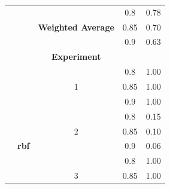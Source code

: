 \documentclass{mpaper}
\begin{document}
\begin{table}[]
\begin{tabular}{|l|c|ccc|}
                                            &                 & \multicolumn{1}{l|}{}                          & \multicolumn{1}{c|}{0.8}                & 0.78               \\
                                            &                 & \multicolumn{1}{c|}{\textbf{Weighted Average}} & \multicolumn{1}{c|}{0.85}               & 0.70               \\
                                            &                 & \multicolumn{1}{l|}{}                          & \multicolumn{1}{c|}{0.9}                & 0.63               \\ \hline
                                            &                 & \multicolumn{1}{c|}{\textbf{Experiment}}       & \multicolumn{1}{c|}{}                   & \textbf{}          \\ \cline{3-5} 
                                            &                 & \multicolumn{1}{c|}{}                          & \multicolumn{1}{c|}{0.8}                & 1.00               \\
                                            &                 & \multicolumn{1}{c|}{1}                         & \multicolumn{1}{c|}{0.85}               & 1.00               \\
                                            &                 & \multicolumn{1}{c|}{}                          & \multicolumn{1}{c|}{0.9}                & 1.00               \\ \cline{3-5} 
                                            &                 & \multicolumn{1}{c|}{}                          & \multicolumn{1}{c|}{0.8}                & 0.15               \\
                                            & \textbf{}       & \multicolumn{1}{c|}{2}                         & \multicolumn{1}{c|}{0.85}               & 0.10               \\
                                            & \textbf{rbf}    & \multicolumn{1}{c|}{}                          & \multicolumn{1}{c|}{0.9}                & 0.06               \\ \cline{3-5} 
                                            &                 & \multicolumn{1}{c|}{}                          & \multicolumn{1}{c|}{0.8}                & 1.00               \\
                                            &                 & \multicolumn{1}{c|}{3}                         & \multicolumn{1}{c|}{0.85}               & 1.00               \\

\end{tabular}
\end{table}
\end{document}
